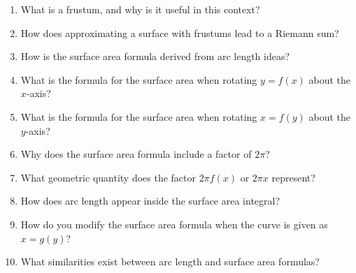 \begin{enumerate}
\item What is a frustum, and why is it useful in this context?

\item How does approximating a surface with frustums lead to a Riemann sum?

\item How is the surface area formula derived from arc length ideas?

\item What is the formula for the surface area when rotating $y=f(x)$ about the $x$-axis?

\item What is the formula for the surface area when rotating $x=f(y)$ about the $y$-axis?

\item Why does the surface area formula include a factor of $2\pi$?

\item What geometric quantity does the factor $2\pi f(x)$ or $2\pi x$ represent?

\item How does arc length appear inside the surface area integral?

\item How do you modify the surface area formula when the curve is given as $x=g(y)$?

\item What similarities exist between arc length and surface area formulas?

\end{enumerate}

